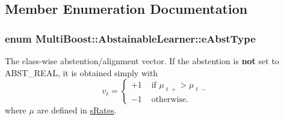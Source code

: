 \subsection{Member Enumeration Documentation}
\hypertarget{classMultiBoost_1_1AbstainableLearner_a913d773affdee935e319707266a29599}{
\subsubsection[{e\-Abst\-Type}]{\setlength{\rightskip}{0pt plus 5cm}enum {\bf Multi\-Boost\-::\-Abstainable\-Learner\-::e\-Abst\-Type}\hspace{0.3cm}{\ttfamily [protected]}}}\label{classMultiBoost_1_1AbstainableLearner_a913d773affdee935e319707266a29599}
The class-\/wise abstention/alignment vector. If the abstention is {\bfseries not} set to A\-B\-S\-T\-\_\-\-R\-E\-A\-L, it is obtained simply with \[ v_\ell = \begin{cases} +1 & \mbox{ if } \mu_{\ell+} > \mu_{\ell-}\\ -1 & \mbox{ otherwise.} \end{cases} \] where $\mu$ are defined in \hyperlink{structMultiBoost_1_1sRates}{s\-Rates}.


